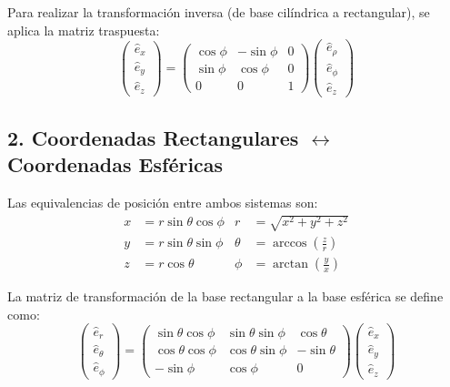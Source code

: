 \documentclass[11pt, a4paper]{article}
\begin{document}
Para realizar la transformación inversa (de base cilíndrica a rectangular), se aplica la matriz traspuesta:
\begin{equation*}
    \begin{pmatrix} \hat{e}_x \\ \hat{e}_y \\ \hat{e}_z \end{pmatrix} = 
    \begin{pmatrix} 
        \cos\phi & -\sin\phi & 0 \\ 
        \sin\phi & \cos\phi & 0 \\ 
        0 & 0 & 1 
    \end{pmatrix}
    \begin{pmatrix} \hat{e}_\rho \\ \hat{e}_\phi \\ \hat{e}_z \end{pmatrix}
\end{equation*}

\subsection{2. Coordenadas Rectangulares $\leftrightarrow$ Coordenadas Esféricas}

Las equivalencias de posición entre ambos sistemas son:
\begin{align*}
    x &= r\sin\theta\cos\phi & r      &= \sqrt{x^2+y^2+z^2} \\
    y &= r\sin\theta\sin\phi & \theta &= \arccos\left(\frac{z}{r}\right) \\
    z &= r\cos\theta         & \phi   &= \arctan\left(\frac{y}{x}\right)
\end{align*}

La matriz de transformación de la base rectangular a la base esférica se define como:
\begin{equation*}
    \begin{pmatrix} \hat{e}_r \\ \hat{e}_\theta \\ \hat{e}_\phi \end{pmatrix} = 
    \begin{pmatrix} 
        \sin\theta\cos\phi & \sin\theta\sin\phi & \cos\theta \\ 
        \cos\theta\cos\phi & \cos\theta\sin\phi & -\sin\theta \\ 
        -\sin\phi & \cos\phi & 0 
    \end{pmatrix}
    \begin{pmatrix} \hat{e}_x \\ \hat{e}_y \\ \hat{e}_z \end{pmatrix}
\end{equation*}
\end{document}
